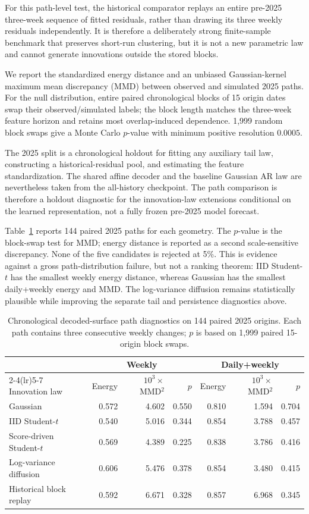 \documentclass[11pt,a4paper]{article}
\begin{document}
For this path-level test, the historical comparator replays an entire
pre-2025 three-week sequence of fitted residuals, rather than drawing its
three weekly residuals independently.  It is therefore a deliberately strong
finite-sample benchmark that preserves short-run clustering, but it is not a
new parametric law and cannot generate innovations outside the stored blocks.

We report the standardized energy distance and an unbiased Gaussian-kernel
maximum mean discrepancy (MMD) between observed and simulated 2025 paths.
For the null distribution, entire paired chronological blocks of 15 origin
dates swap their observed/simulated labels; the block length matches the
three-week feature horizon and retains most overlap-induced dependence.
1,999 random block swaps give a Monte Carlo $p$-value with minimum positive
resolution $0.0005$.

The 2025 split is a chronological holdout for fitting any auxiliary tail law,
constructing a historical-residual pool, and estimating the feature
standardization.  The shared affine decoder and the baseline Gaussian AR law
are nevertheless taken from the all-history checkpoint.  The path comparison
is therefore a holdout diagnostic for the innovation-law extensions
conditional on the learned representation, not a fully frozen pre-2025 model
forecast.

Table~\ref{tab:path-realism} reports 144 paired 2025 paths for each geometry.
The $p$-value is the block-swap test for MMD; energy distance is reported as a
second scale-sensitive discrepancy.  None of the five candidates is rejected
at 5\%.  This is evidence against a gross path-distribution failure, but not a
ranking theorem: IID Student-$t$ has the smallest weekly energy distance,
whereas Gaussian has the smallest daily+weekly energy and MMD.  The
log-variance diffusion remains statistically plausible while improving the
separate tail and persistence diagnostics above.

\begin{table}[H]
\centering
\small
\begin{tabular}{lrrrrrr}
\toprule
& \multicolumn{3}{c}{Weekly} & \multicolumn{3}{c}{Daily+weekly}\\
\cmidrule(lr){2-4}\cmidrule(lr){5-7}
Innovation law & Energy & $10^3\!\times$MMD$^2$ & $p$ & Energy & $10^3\!\times$MMD$^2$ & $p$\\
\midrule
Gaussian & 0.572 & 4.602 & 0.550 & 0.810 & 1.594 & 0.704\\
IID Student-$t$ & 0.540 & 5.016 & 0.344 & 0.854 & 3.788 & 0.457\\
Score-driven Student-$t$ & 0.569 & 4.389 & 0.225 & 0.838 & 3.786 & 0.416\\
Log-variance diffusion & 0.606 & 5.476 & 0.378 & 0.854 & 3.480 & 0.415\\
Historical block replay & 0.592 & 6.671 & 0.328 & 0.857 & 6.968 & 0.345\\
\bottomrule
\end{tabular}
\caption{Chronological decoded-surface path diagnostics on 144 paired 2025
origins.  Each path contains three consecutive weekly changes; $p$ is based
on 1,999 paired 15-origin block swaps.}
\label{tab:path-realism}
\end{table}
\end{document}
